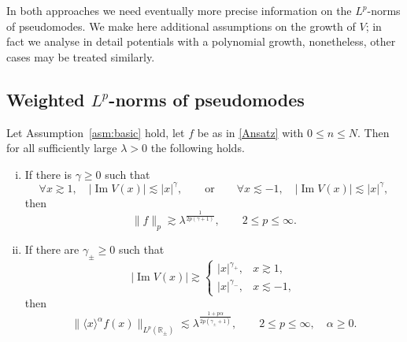 In both approaches we need eventually more precise information on the $L^p$-norms of pseudomodes. We make here additional assumptions on the growth of $V$; in fact we analyse in detail potentials with a polynomial growth, nonetheless, other cases may be treated similarly.

\subsection{Weighted $L^p$-norms of pseudomodes}

\begin{Lemma}\label{lem:Lp}
Let Assumption~\ref{asm:basic} hold, let $f$ be as in \eqref{Ansatz} 
with  $0 \leq n \leq N$. Then for all sufficiently large $\lambda >0$ 
the following holds.
\begin{enumerate}[i)]
\item If there is $\gamma \geq 0$ such that
\begin{equation}\label{ImV.lb}
\forall x {\gtrsim} 1, \quad |{\operatorname{Im}} V(x)| {\lesssim} |x|^\gamma, 
\qquad \text{or} \qquad  
\forall x {\lesssim} -1, \quad |{\operatorname{Im}} V(x)| {\lesssim} |x|^\gamma, 
\end{equation}
then
\begin{equation}\label{f.p.lb}
\|f\|_p {\gtrsim} \lambda^\frac{1}{2p(\gamma+1)}, \qquad 2 \leq p \leq \infty.
\end{equation}
\item If there are $\gamma_\pm \geq 0$ such that
\begin{equation}\label{ImV.ub}
|{\operatorname{Im}} V(x)| {\gtrsim}
\begin{cases}
|x|^{\gamma_+}, & x {\gtrsim} 1,
\\ 
|x|^{\gamma_-}, & x {\lesssim} -1,
\end{cases} 
\end{equation}
then
\begin{equation}\label{f.gamma.p.ub}
\|\langle x \rangle^\alpha f(x)\|_{L^p({\mathbb{R}}_\pm)} {\lesssim} \lambda^\frac{1+p\alpha}{2p(\gamma_\pm+1)}, \qquad 2 \leq p \leq \infty, \quad \alpha \geq 0 .
\end{equation}
\end{enumerate}
\end{Lemma}
